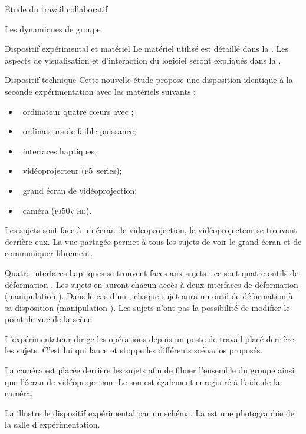 \documentclass[myfrancais]{mythesis}
\begin{document}
\begin{mypart}{Étude du travail collaboratif}
\begin{mychapter}{Les dynamiques de groupe}
\begin{mysection}{Dispositif expérimental et matériel}
				Le matériel utilisé est détaillé dans la .
				Les aspects de visualisation et d'interaction du logiciel seront expliqués dans la .
				\begin{mysubsection}{Dispositif technique}
					Cette nouvelle étude propose une disposition identique à la seconde expérimentation  avec les matériels suivants :
					\begin{itemize}
						\item {}~ordinateur quatre cœurs \myIntelCore avec ;
						\item {}~ordinateurs de faible puissance;
						\item {}~interfaces haptiques \myOmni;
						\item {}~vidéoprojecteur \myACER (\textsc{p5}~series);
						\item {}~grand écran de vidéoprojection;
						\item {}~caméra \mySony (\textsc{pj50v hd}).
					\end{itemize}

					Les sujets sont face à un écran de vidéoprojection, le vidéoprojecteur se trouvant derrière eux.
					La vue partagée permet à tous les sujets de voir le grand écran et de communiquer librement.

					Quatre interfaces haptiques se trouvent faces aux sujets : ce sont quatre outils de déformation  .
					Les sujets en  auront chacun accès à deux interfaces de déformation (manipulation ).
					Dans le cas d'un , chaque sujet aura un outil de déformation à sa disposition (manipulation ).
					Les sujets n'ont pas la possibilité de modifier le point de vue de la scène.

					L'expérimentateur dirige les opérations depuis un poste de travail placé derrière les sujets.
					C'est lui qui lance et stoppe les différents scénarios proposés.

					La caméra est placée derrière les sujets afin de filmer l'ensemble du groupe ainsi que l'écran de vidéoprojection.
					Le son est également enregistré à l'aide de la caméra.

					La  illustre le dispositif expérimental par un schéma.
					La  est une photographie de la salle d'expérimentation.


\end{mysubsection}
\end{mysection}
\end{mychapter}
\end{mypart}
\end{document}
